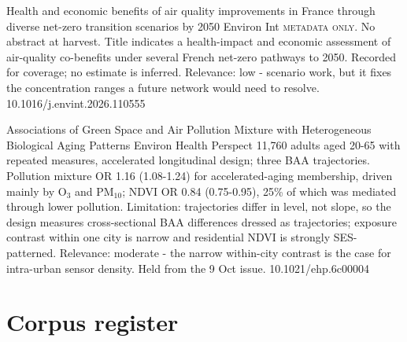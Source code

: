 \documentclass[10pt]{article}
\begin{document}
{Health and economic benefits of air quality improvements in France through diverse net-zero transition scenarios by 2050}
{Environ Int}
{\textsc{metadata only.} No abstract at harvest. Title indicates a health-impact and economic assessment of air-quality co-benefits under several French net-zero pathways to 2050. Recorded for coverage; no estimate is inferred. Relevance: low - scenario work, but it fixes the concentration ranges a future network would need to resolve.}
{10.1016/j.envint.2026.110555}

\par{}\baselineskip{}\baselineskip
{}

{Associations of Green Space and Air Pollution Mixture with Heterogeneous Biological Aging Patterns}
{Environ Health Perspect}
{11,760 adults aged 20-65 with repeated measures, accelerated longitudinal design; three BAA trajectories. Pollution mixture OR 1.16 (1.08-1.24) for accelerated-aging membership, driven mainly by O$_3$ and PM$_{10}$; NDVI OR 0.84 (0.75-0.95), 25\% of which was mediated through lower pollution. Limitation: trajectories differ in level, not slope, so the design measures cross-sectional BAA differences dressed as trajectories; exposure contrast within one city is narrow and residential NDVI is strongly SES-patterned. Relevance: moderate - the narrow within-city contrast is the case for intra-urban sensor density. Held from the 9 Oct issue.}
{10.1021/ehp.6c00004}

\clearpage
\section*{\sffamily\bfseries\color{Deep}Corpus register}
\vspace{-1.5mm}{\color{Amber}\rule{\linewidth}{1.1pt}}\vspace{2.5mm}



\vspace{2mm}
\end{document}
